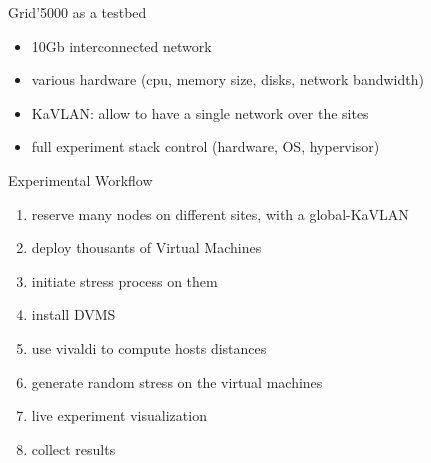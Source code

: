 \documentclass{beamer}
\begin{document}
{
\begin{frame}{Grid'5000 as a testbed}
\begin{itemize}
    \item 10Gb interconnected network
    \item various hardware (cpu, memory size, disks, network bandwidth)
    \item KaVLAN: allow to have a single network over the sites
    \item full experiment stack control (hardware, OS, hypervisor)
\end{itemize}
\end{frame}
}


\begin{frame}{Experimental Workflow}
\begin{enumerate}
    \item reserve many nodes on different sites, with a global-KaVLAN
    \item deploy thousants of Virtual Machines
    \item initiate stress process on them
    \item install DVMS
    \item use vivaldi to compute hosts distances
    \item generate random stress on the virtual machines
    \item live experiment visualization
    \item collect results
\end{enumerate}
\end{frame}
\end{document}
